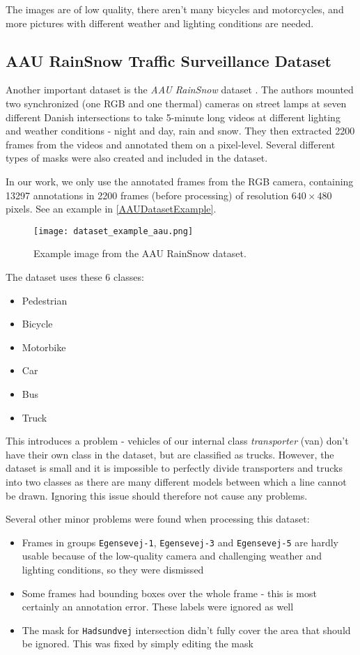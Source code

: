The images are of low quality, there aren't many bicycles and motorcycles, and
more pictures with different weather and lighting conditions are needed.


\subsection{AAU RainSnow Traffic Surveillance Dataset}
\label{AAUDataset}

Another important dataset is the \textit{AAU RainSnow} dataset
\cite{Bahnsen2019}. The authors mounted two synchronized (one RGB and one
thermal) cameras on street lamps at seven different Danish intersections to take
5-minute long videos at different lighting and weather conditions - night and
day, rain and snow. They then extracted \num{2200} frames from the videos and
annotated them on a pixel-level. Several different types of masks were also
created and included in the dataset.

In our work, we only use the annotated frames from the RGB camera, containing
\num{13297} annotations in \num{2200} frames (before processing) of resolution
$640 \times 480$ pixels. See an example in \autoref{AAUDatasetExample}.

\begin{figure}[h]
    \centering
    \texttt{[image: dataset\_example\_aau.png]}
    \caption{Example image from the AAU RainSnow dataset.}
    \label{AAUDatasetExample}
\end{figure}

The dataset uses these 6 classes:
\begin{itemize}
    \item Pedestrian
    \item Bicycle
    \item Motorbike
    \item Car
    \item Bus
    \item Truck
\end{itemize}
This introduces a problem - vehicles of our internal class \textit{transporter}
(van) don't have their own class in the dataset, but are classified as trucks.
However, the dataset is small and it is impossible to perfectly divide
transporters and trucks into two classes as there are many different models
between which a line cannot be drawn.  Ignoring this issue should therefore not
cause any problems.

Several other minor problems were found when processing this dataset:
\begin{itemize}
    \item Frames in groups \verb|Egensevej-1|, \verb|Egensevej-3| and
    \verb|Egensevej-5| are hardly usable because of the low-quality camera and
    challenging weather and lighting conditions, so they were dismissed
    \item Some frames had bounding boxes over the whole frame - this is most
    certainly an annotation error. These labels were ignored as well
    \item The mask for \verb|Hadsundvej| intersection didn't fully cover the
    area that should be ignored. This was fixed by simply editing the mask
\end{itemize}

